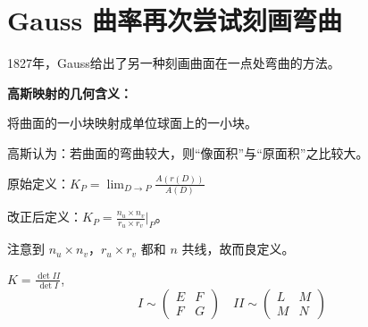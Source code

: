 \documentclass[lang=cn,10pt,thmcnt=section]{elegantbook}
\begin{document}
\section{Gauss 曲率再次尝试刻画弯曲}


1827年，Gauss给出了另一种刻画曲面在一点处弯曲的方法。

\textbf{高斯映射的几何含义：}

将曲面的一小块映射成单位球面上的一小块。

高斯认为：若曲面的弯曲较大，则“像面积”与“原面积”之比较大。
\begin{definition}[Gauss曲率]
    原始定义：$K_P = \lim_{D \to P} \frac{A(r(D))}{A(D)}$

改正后定义：$K_P = \frac{n_u \times n_v}{r_u \times r_v} \bigg|_P$。

注意到 $n_u \times n_v$，$r_u \times r_v$ 都和 $n$ 共线，故而良定义。
\end{definition}
\begin{proposition}
    $K = \frac{\det II}{\det I}$,\begin{equation}
        I \sim \begin{pmatrix} E & F \\ F & G \end{pmatrix} \quad II \sim \begin{pmatrix} L & M \\ M & N \end{pmatrix}
    \end{equation}
\end{proposition}
\end{document}
